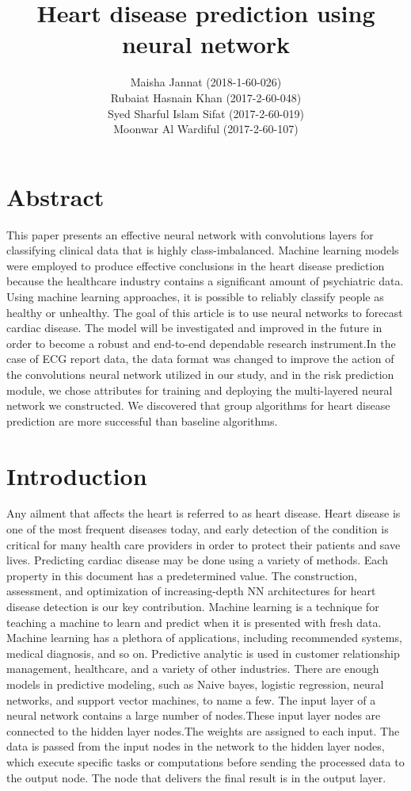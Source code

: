 \documentclass[12pt]{article}
\title{Heart disease prediction using neural network}
\author{Maisha Jannat (2018-1-60-026)\\
		Rubaiat Hasnain Khan (2017-2-60-048)\\ 
	    Syed Sharful Islam Sifat (2017-2-60-019)\\
		Moonwar Al Wardiful (2017-2-60-107) }
\date{}
\begin{document}
\maketitle
\tableofcontents
\clearpage
\section{Abstract}
This paper presents an effective neural network with convolutions layers for classifying clinical data that is highly class-imbalanced. Machine learning models were employed to produce effective conclusions in the heart disease prediction because the healthcare industry contains a significant amount of psychiatric data. Using machine learning approaches, it is possible to reliably classify people as healthy or unhealthy. The goal of this article is to use neural networks to forecast cardiac disease. The model will be investigated and improved in the future in order to become a robust and end-to-end dependable research instrument.In the case of ECG report data, the data format was changed to improve the action of the convolutions neural network utilized in our study, and in the risk prediction module, we chose attributes for training and deploying the multi-layered neural network we constructed. We discovered that group algorithms for heart disease prediction are more successful than baseline algorithms.
\section{Introduction}
Any ailment that affects the heart is referred to as heart disease. Heart disease is one of the most frequent diseases today, and early detection of the condition is critical for many health care providers in order to protect their patients and save lives. Predicting cardiac disease may be done using a variety of methods. Each property in this document has a predetermined value. The construction, assessment, and optimization of increasing-depth NN architectures for heart disease detection is our key contribution.
Machine learning is a technique for teaching a machine to learn and predict when it is presented with fresh data. Machine learning has a plethora of applications, including recommended systems, medical diagnosis, and so on.
Predictive analytic is used in customer relationship management, healthcare, and a variety of other industries. There are enough models in predictive modeling, such as Naive bayes, logistic regression, neural networks, and support vector machines, to name a few. The input layer of a neural network contains a large number of nodes.These input layer nodes are connected to the hidden layer nodes.The weights are assigned to each input. The data is passed from the input nodes in the network to the hidden layer nodes, which execute specific tasks or computations before sending the processed data to the output node. The node that delivers the final result is in the output layer.
\end{document}
